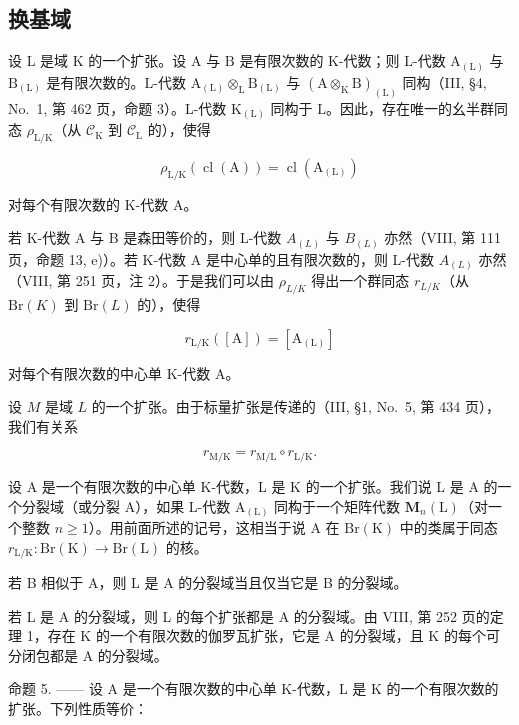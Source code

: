 \subsection{换基域}

设 \(\mathrm{L}\) 是域 \(\mathrm{K}\) 的一个扩张。设 \(\mathrm{A}\) 与 \(\mathrm{B}\) 是有限次数的 K-代数；则 L-代数 \(\mathrm{A}_{(\mathrm{L})}\) 与 \(\mathrm{B}_{(\mathrm{L})}\) 是有限次数的。L-代数 \(\mathrm{A}_{(\mathrm{L})} \otimes_{\mathrm{L}} \mathrm{B}_{(\mathrm{L})}\) 与 \((\mathrm{A} \otimes_{\mathrm{K}} \mathrm{B})_{(\mathrm{L})}\) 同构（III, §4, No.~1, 第 462 页，命题 3）。L-代数 \(\mathrm{K}_{(\mathrm{L})}\) 同构于 \(\mathrm{L}\)。因此，存在唯一的幺半群同态 \(\rho_{\mathrm{L/K}}\)（从 \(\mathcal{C}_{\mathrm{K}}\) 到 \(\mathcal{C}_{\mathrm{L}}\) 的），使得

\[
\rho_ {\mathrm{L/K}} (\operatorname{cl} (\mathrm{A})) = \operatorname{cl} (\mathrm{A} _ {(\mathrm{L})})\tag{3}
\]

对每个有限次数的 K-代数 A。

若 K-代数 A 与 B 是森田等价的，则 L-代数 \(A_{(L)}\) 与 \(B_{(L)}\) 亦然（VIII, 第 111 页，命题 13, e)）。若 K-代数 A 是中心单的且有限次数的，则 L-代数 \(A_{(L)}\) 亦然（VIII, 第 251 页，注 2）。于是我们可以由 \(\rho_{L/K}\) 得出一个群同态 \(r_{L/K}\)（从 \(\mathrm{Br}(K)\) 到 \(\mathrm{Br}(L)\) 的），使得

\[
r _ {\mathrm{L/K}} ([ \mathrm{A} ]) = [ \mathrm{A} _ {(\mathrm{L})} ]\tag{4}
\]

对每个有限次数的中心单 K-代数 A。

设 \(M\) 是域 \(L\) 的一个扩张。由于标量扩张是传递的（III, §1, No.~5, 第 434 页），我们有关系

\[
r _ {\mathrm{M/K}} = r _ {\mathrm{M/L}} \circ r _ {\mathrm{L/K}}.\tag{5}
\]

设 A 是一个有限次数的中心单 K-代数，L 是 K 的一个扩张。我们说 L 是 A 的一个分裂域（或分裂 A），如果 L-代数 \(\mathrm{A}_{(\mathrm{L})}\) 同构于一个矩阵代数 \(\mathbf{M}_{n}(\mathrm{L})\)（对一个整数 \(n \geqslant 1\)）。用前面所述的记号，这相当于说 A 在 \(\mathrm{Br}(\mathrm{K})\) 中的类属于同态 \(r_{\mathrm{L/K}} : \mathrm{Br}(\mathrm{K}) \to \mathrm{Br}(\mathrm{L})\) 的核。

若 B 相似于 A，则 L 是 A 的分裂域当且仅当它是 B 的分裂域。

若 L 是 A 的分裂域，则 L 的每个扩张都是 A 的分裂域。由 VIII, 第 252 页的定理 1，存在 K 的一个有限次数的伽罗瓦扩张，它是 A 的分裂域，且 K 的每个可分闭包都是 A 的分裂域。

命题 5. —— 设 A 是一个有限次数的中心单 K-代数，L 是 K 的一个有限次数的扩张。下列性质等价：

